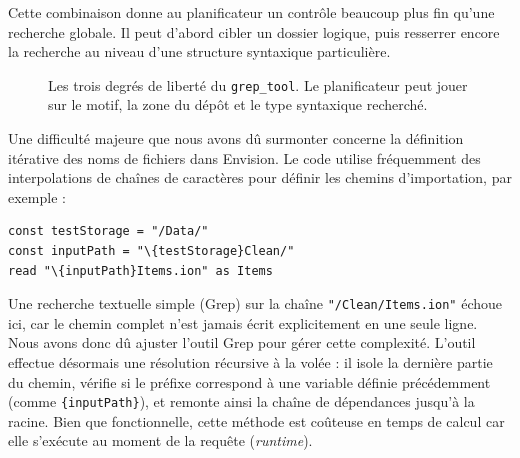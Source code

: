 Cette combinaison donne au planificateur un contrôle beaucoup plus fin qu'une recherche globale. Il peut d'abord cibler un dossier logique, puis resserrer encore la recherche au niveau d'une structure syntaxique particulière.

\begin{figure}[H]
\begin{center}
\end{center}
\caption{Les trois degrés de liberté du \texttt{grep\_tool}. Le planificateur peut jouer sur le motif, la zone du dépôt et le type syntaxique recherché.}
\end{figure}

Une difficulté majeure que nous avons dû surmonter concerne la définition itérative des noms de fichiers dans Envision. Le code utilise fréquemment des interpolations de chaînes de caractères pour définir les chemins d'importation, par exemple :
\begin{verbatim}
const testStorage = "/Data/"
const inputPath = "\{testStorage}Clean/"
read "\{inputPath}Items.ion" as Items
\end{verbatim}
Une recherche textuelle simple (Grep) sur la chaîne \texttt{"/Clean/Items.ion"} échoue ici, car le chemin complet n'est jamais écrit explicitement en une seule ligne.
\\
Nous avons donc dû ajuster l'outil Grep pour gérer cette complexité. L'outil effectue désormais une résolution récursive à la volée : il isole la dernière partie du chemin, vérifie si le préfixe correspond à une variable définie précédemment (comme \texttt{\{inputPath\}}), et remonte ainsi la chaîne de dépendances jusqu'à la racine. Bien que fonctionnelle, cette méthode est coûteuse en temps de calcul car elle s'exécute au moment de la requête (\textit{runtime}).

